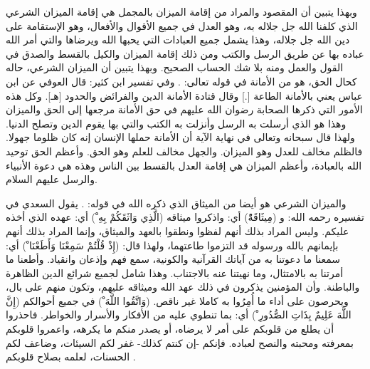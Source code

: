 وبهذا يتبين أن المقصود والمراد من إقامة الميزان بالمجمل هي إقامة الميزان الشرعي الذي كلفنا الله جل جلاله به، وهو العدل في جميع الأقوال والأفعال، وهو الإستقامة على دين الله جل جلاله، وهذا يشمل جميع العبادات التي يحبها الله ويرضاها والتي أمر الله عباده بها عن طريق الرسل والكتب ومن ذلك إقامة الميزان والكيل بالقسط والصدق في القول والعمل ومنه بلا شك الحساب الصحيح. وبهذا يتبين أن الميزان الشرعي، حاله كحال الحق، هو من الأمانة في قوله تعالى:
\quranayah*[33][72]{\footnotesize \surahname*[33]}. وفي تفسير ابن كثير: قال العوفي عن ابن عباس يعني بالأمانة الطاعة [.] وقال قتادة الأمانة الدين والفرائض والحدود [هـ]. وكل هذه الأمور التي ذكرها الصحابة رضوان الله عليهم في حق الأمانة مرجعها إلى الحق والميزان وهذا هو الذي أرسلت به الرسل وأنزلت به الكتب والتي بها يقوم الدين وتصلح الدنيا. ولهذا قال سبحانه وتعالى في نهاية الآية أن الأمانة حملها الإنسان إنه كان ظلوما جهولا. فالظلم مخالف للعدل وهو الميزان. والجهل مخالف للعلم وهو الحق. وأعظم الحق توحيد الله بالعبادة، وأعظم الميزان هي إقامة العدل بالقسط بين الناس وهذه هي دعوة الأنبياء والرسل عليهم السلام.

والميزان الشرعي هو أيضا من الميثاق الذي ذكره الله في قوله:
\quranayah*[5][7]{\footnotesize \surahname*[5]}. يقول السعدي في تفسيره رحمه الله:
و (مِيثَاقَهُْ) أي: واذكروا ميثاقه (الَّذِي وَاثَقَكُمْ بِهِ ْ) أي: عهده الذي أخذه عليكم. وليس المراد بذلك أنهم لفظوا ونطقوا بالعهد والميثاق، وإنما المراد بذلك أنهم بإيمانهم بالله ورسوله قد التزموا طاعتهما، ولهذا قال: (إِذْ قُلْتُمْ سَمِعْنَا وَأَطَعْنَا ْ) أي: سمعنا ما دعوتنا به من آياتك القرآنية والكونية، سمع فهم وإذعان وانقياد. وأطعنا ما أمرتنا به بالامتثال، وما نهيتنا عنه بالاجتناب. وهذا شامل لجميع شرائع الدين الظاهرة والباطنة. وأن المؤمنين يذكرون في ذلك عهد الله وميثاقه عليهم، وتكون منهم على بال، ويحرصون على أداء ما أُمِرُوا به كاملا غير ناقص. (وَاتَّقُوا اللَّهَ ْ) في جميع أحوالكم (إِنَّ اللَّهَ عَلِيمٌ بِذَاتِ الصُّدُورِ ْ) أي: بما تنطوي عليه من الأفكار والأسرار والخواطر. فاحذروا أن يطلع من قلوبكم على أمر لا يرضاه، أو يصدر منكم ما يكرهه، واعمروا قلوبكم بمعرفته ومحبته والنصح لعباده. فإنكم -إن كنتم كذلك- غفر لكم السيئات، وضاعف لكم الحسنات، لعلمه بصلاح قلوبكم \cite{tafsir_Saadi}.

